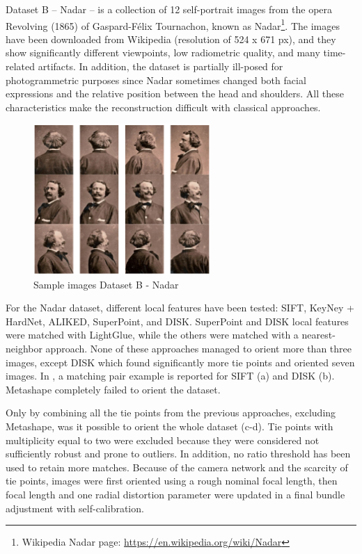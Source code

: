 Dataset B – Nadar – is a collection of 12 self-portrait images from the opera Revolving (1865) of Gaspard-Félix Tournachon, known as Nadar\footnote{Wikipedia Nadar page: \url{https://en.wikipedia.org/wiki/Nadar}}. 
The images have been downloaded from Wikipedia (resolution of 524 x 671 px), and they show significantly different viewpoints, low radiometric quality, and many time-related artifacts. 
In addition, the dataset is partially ill-posed for photogrammetric purposes since Nadar sometimes changed both facial expressions and the relative position between the head and shoulders. 
All these characteristics make the reconstruction difficult with classical approaches.

\begin{figure}
    \centering
    \includegraphics[width=0.6\textwidth]{nadar_images}
    \caption{Sample images Dataset B - Nadar}
    \label{fig:5:nadar_images}
\end{figure}

For the Nadar dataset, different local features have been tested: SIFT, KeyNey + HardNet, ALIKED, SuperPoint, and DISK.
SuperPoint and DISK local features were matched with LightGlue, while the others were matched with a nearest-neighbor approach. 
None of these approaches managed to orient more than three images, except DISK which found significantly more tie points and oriented seven images. 
In , a matching pair example is reported for SIFT (a) and DISK (b).
Metashape completely failed to orient the dataset. 

Only by combining all the tie points from the previous approaches, excluding Metashape, was it possible to orient the whole dataset (c-d). 
Tie points with multiplicity equal to two were excluded because they were considered not sufficiently robust and prone to outliers. 
In addition, no ratio threshold has been used to retain more matches. 
Because of the camera network and the scarcity of tie points, images were first oriented using a rough nominal focal length, then focal length and one radial distortion parameter were updated in a final bundle adjustment with self-calibration.


